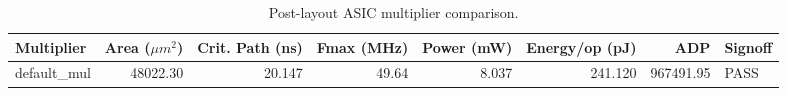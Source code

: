 \begin{table}[t]
\centering
\caption{Post-layout ASIC multiplier comparison.}
\label{tab:multiplier_metrics}
\begin{tabular}{lrrrrrrl}
\hline
Multiplier & Area ($\mu m^2$) & Crit. Path (ns) & Fmax (MHz) & Power (mW) & Energy/op (pJ) & ADP & Signoff \\
\hline
default\_mul & 48022.30 & 20.147 & 49.64 & 8.037 & 241.120 & 967491.95 & PASS \\
\hline
\end{tabular}
\end{table}
